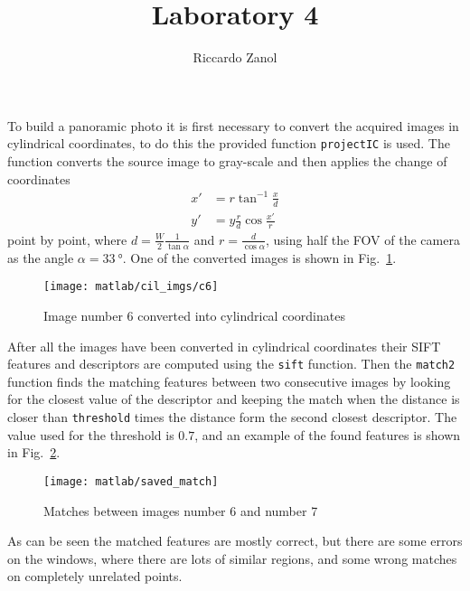 \documentclass[a4paper,oneside]{article}
\author{Riccardo Zanol}
\title{Laboratory 4}
\newcommand{\inlinecode}[1]{\lstinline[basicstyle=\ttfamily,keywordstyle={},stringstyle={},commentstyle={\itshape}]{#1}}
\begin{document}
\maketitle

To build a panoramic photo it is first necessary to convert the
acquired images in cylindrical coordinates, to do this the provided
function \inlinecode{projectIC} is used. The function converts the
source image to gray-scale and then applies the change of coordinates
\begin{align*}
  x' &= r\tan^{-1}\frac{x}{d} \\
  y' &= y\frac{r}{d}\cos\frac{x'}{r}
\end{align*}
point by point, where $d = \frac{W}{2}\frac{1}{\tan\alpha}$ and $r =
\frac{d}{\cos\alpha}$, using half the FOV of the camera as the angle
$\alpha = \SI{33}{\degree}$. One of the converted images is shown in
Fig.~\ref{fig:cil}.
\begin{figure}[htbp]
  \centering
  \texttt{[image: matlab/cil\_imgs/c6]}
  \caption{Image number 6 converted into cylindrical coordinates}
  \label{fig:cil}
\end{figure}

After all the images have been converted in cylindrical coordinates
their SIFT features and descriptors are computed using the
\inlinecode{sift} function. Then the \inlinecode{match2} function
finds the matching features between two consecutive images by looking
for the closest value of the descriptor and keeping the match when the
distance is closer than \inlinecode{threshold} times the distance form
the second closest descriptor. The value used for the threshold is
$0.7$, and an example of the found features is shown in Fig.~\ref{fig:match}.
\begin{figure}[htbp]
  \centering
  \texttt{[image: matlab/saved\_match]}
  \caption{Matches between images number 6 and number 7}
  \label{fig:match}
\end{figure}
As can be seen the matched features are mostly correct, but there are
some errors on the windows, where there are lots of similar regions,
and some wrong matches on completely unrelated points.
\end{document}
